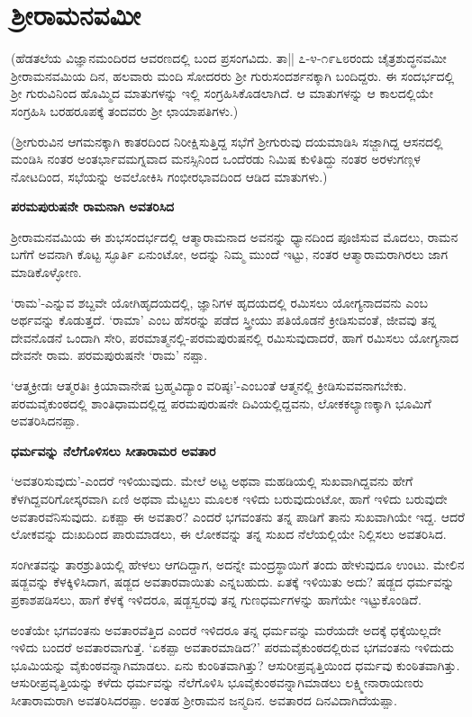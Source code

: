 \chapter{ಶ್ರೀರಾಮನವಮೀ} 

(ಹೆಡತಲೆಯ ವಿಜ್ಞಾನಮಂದಿರದ ಆವರಣದಲ್ಲಿ ಬಂದ ಪ್ರಸಂಗವಿದು. ತಾ|| ೭-೪-೧೯೬೮ರಂದು ಚೈತ್ರಶುದ್ಧನವಮೀ ಶ್ರೀರಾಮನವಮಿಯ ದಿನ, ಹಲವಾರು ಮಂದಿ ಸೋದರರು ಶ್ರೀ ಗುರುಸಂದರ್ಶನಕ್ಕಾಗಿ ಬಂದಿದ್ದರು. ಈ ಸಂದರ್ಭದಲ್ಲಿ ಶ್ರೀ ಗುರುವಿನಿಂದ ಹೊಮ್ಮಿದ ಮಾತುಗಳನ್ನು ಇಲ್ಲಿ ಸಂಗ್ರಹಿಸಿಕೊಡಲಾಗಿದೆ. ಆ ಮಾತುಗಳನ್ನು ಆ ಕಾಲದಲ್ಲಿಯೇ ಸಂಗ್ರಹಿಸಿ ಬರಹರೂಪಕ್ಕೆ ತಂದವರು ಶ್ರೀ ಛಾಯಾಪತಿಗಳು.) 

(ಶ್ರೀಗುರುವಿನ ಆಗಮನಕ್ಕಾಗಿ ಕಾತರದಿಂದ ನಿರೀಕ್ಷಿಸುತ್ತಿದ್ದ ಸಭೆಗೆ ಶ್ರೀಗುರುವು ದಯಮಾಡಿಸಿ ಸಜ್ಜಾಗಿದ್ದ ಆಸನದಲ್ಲಿ ಮಂಡಿಸಿ ನಂತರ ಅಂತರ್ಭಾವಮಗ್ನವಾದ ಮನಸ್ಸಿನಿಂದ ಒಂದೆರಡು ನಿಮಿಷ ಕುಳಿತಿದ್ದು ನಂತರ ಅರಳುಗಣ್ಗಳ ನೋಟದಿಂದ, ಸಭೆಯನ್ನು ಅವಲೋಕಿಸಿ ಗಂಭೀರಭಾವದಿಂದ ಆಡಿದ ಮಾತುಗಳು.) 

\large{\bf{ಪರಮಪುರುಷನೇ ರಾಮನಾಗಿ ಅವತರಿಸಿದ}} 


ಶ್ರೀರಾಮನವಮಿಯ ಈ ಶುಭಸಂದರ್ಭದಲ್ಲಿ ಆತ್ಮಾರಾಮನಾದ ಅವನನ್ನು ಧ್ಯಾನದಿಂದ ಪೂಜಿಸುವ ಮೊದಲು, ರಾಮನ ಬಗೆಗೆ ಅವನಾಗಿ ಕೊಟ್ಟ ಸ್ಫೂರ್ತಿ ಏನುಂಟೋ, ಅದನ್ನು ನಿಮ್ಮ ಮುಂದೆ ಇಟ್ಟು, ನಂತರ ಆತ್ಮಾರಾಮರಾಗಿರಲು ಜಾಗ ಮಾಡಿಕೊಳ್ಳೋಣ. 


`ರಾಮ'-ಎನ್ನುವ ಶಬ್ದವೇ ಯೋಗಿಹೃದಯದಲ್ಲಿ, ಜ್ಞಾನಿಗಳ ಹೃದಯದಲ್ಲಿ ರಮಿಸಲು ಯೋಗ್ಯನಾದವನು ಎಂಬ ಅರ್ಥವನ್ನು ಕೊಡುತ್ತದೆ. `ರಾಮಾ' ಎಂಬ ಹೆಸರನ್ನು ಪಡೆದ ಸ್ತ್ರೀಯು ಪತಿಯೊಡನೆ ಕ್ರೀಡಿಸುವಂತೆ, ಜೀವವು ತನ್ನ ದೇವನೊಡನೆ ಒಂದಾಗಿ ಸೇರಿ, ಪರಮಾತ್ಮನಲ್ಲಿ-ಪರಮಪುರುಷನಲ್ಲಿ ರಮಿಸುವುದಾದರೆ, ಹಾಗೆ ರಮಿಸಲು ಯೋಗ್ಯನಾದ ದೇವನೇ ರಾಮ. ಪರಮಪುರುಷನೇ `ರಾಮ' ನಪ್ಪಾ. 


`ಆತ್ಮಕ್ರೀಡಃ ಆತ್ಮರತಿಃ ಕ್ರಿಯಾವಾನೇಷ ಬ್ರಹ್ಮವಿದ್ಯಾಂ ವರಿಷ್ಠಃ'-ಎಂಬಂತೆ ಆತ್ಮನಲ್ಲಿ ಕ್ರೀಡಿಸುವವನಾಗಬೇಕು. ಪರಮವೈಕುಂಠದಲ್ಲಿ ಶಾಂತಿಧಾಮದಲ್ಲಿದ್ದ ಪರಮಪುರುಷನೇ ದಿವಿಯಲ್ಲಿದ್ದವನು, ಲೋಕಕಲ್ಯಾಣಕ್ಕಾಗಿ ಭೂಮಿಗೆ ಅವತರಿಸಿದನಪ್ಪಾ. 


\large{\bf{ಧರ್ಮವನ್ನು ನೆಲೆಗೊಳಿಸಲು ಸೀತಾರಾಮರ ಅವತಾರ}} 


`ಅವತರಿಸುವುದು'-ಎಂದರೆ ಇಳಿಯುವುದು. ಮೇಲೆ ಅಟ್ಟ ಅಥವಾ ಮಹಡಿಯಲ್ಲಿ ಸುಖವಾಗಿದ್ದವನು ಹೇಗೆ ಕೆಳಗಿದ್ದವರಿಗೋಸ್ಕರವಾಗಿ ಏಣಿ ಅಥವಾ ಮೆಟ್ಟಲು ಮೂಲಕ ಇಳಿದು ಬರುವುದುಂಟೋ, ಹಾಗೆ ಇಳಿದು ಬರುವುದೇ ಅವತಾರವೆನಿಸುವುದು. ಏಕಪ್ಪಾ ಈ ಅವತಾರ? ಎಂದರೆ ಭಗವಂತನು ತನ್ನ ಪಾಡಿಗೆ ತಾನು ಸುಖವಾಗಿಯೇ ಇದ್ದ. ಆದರೆ ಲೋಕವನ್ನು ದುಃಖದಿಂದ ಪಾರುಮಾಡಲು, ಈ ಲೋಕವನ್ನು ತನ್ನ ಸುಖದ ನೆಲೆಯಲ್ಲಿಯೇ ನಿಲ್ಲಿಸಲು ಅವತರಿಸಿದ. 


ಸಂಗೀತವನ್ನು ತಾರಶ್ರುತಿಯಲ್ಲಿ ಹೇಳಲು ಆಗದಿದ್ದಾಗ, ಅದನ್ನೇ ಮಂದ್ರಸ್ಥಾಯಿಗೆ ತಂದು ಹೇಳುವುದೂ ಉಂಟು. ಮೇಲಿನ ಷಡ್ಜವನ್ನು ಕೆಳಕ್ಕಿಳಿಸಿದಾಗ, ಷಡ್ಜದ ಅವತಾರವಾಯಿತು ಎನ್ನಬಹುದು. ಏತಕ್ಕೆ ಇಳಿಯಿತು ಅದು? ಷಡ್ಜದ ಧರ್ಮವನ್ನು ಪ್ರಕಾಶಪಡಿಸಲು, ಹಾಗೆ ಕೆಳಕ್ಕೆ ಇಳಿದರೂ, ಷಡ್ಜಸ್ವರವು ತನ್ನ ಗುಣಧರ್ಮಗಳನ್ನು ಹಾಗೆಯೇ ಇಟ್ಟುಕೊಂಡಿದೆ. 


ಅಂತೆಯೇ ಭಗವಂತನು ಅವತಾರವೆತ್ತಿದ ಎಂದರೆ ಇಳಿದರೂ ತನ್ನ ಧರ್ಮವನ್ನು ಮರೆಯದೇ ಅದಕ್ಕೆ ಧಕ್ಕೆಯಿಲ್ಲದೇ ಇಳಿದು ಬಂದರೆ ಅವತಾರವಾಗುತ್ತೆ. `ಏಕಪ್ಪಾ ಅವತಾರಮಾಡಿದ?' ಪರಮವೈಕುಂಠದಲ್ಲಿರುವ ಭಗವಂತನು ಇಳಿದುದು ಭೂಮಿಯನ್ನು ವೈಕುಂಠವನ್ನಾಗಿಮಾಡಲು. ಏನು ಕುಂಠಿತವಾಗಿತ್ತು? ಆಸುರೀಪ್ರವೃತ್ತಿಯಿಂದ ಧರ್ಮವು ಕುಂಠಿತವಾಗಿತ್ತು. ಆಸುರೀಪ್ರವೃತ್ತಿಯನ್ನು ಕಳೆದು ಧರ್ಮವನ್ನು ನೆಲೆಗೊಳಿಸಿ ಭೂವೈಕುಂಠವನ್ನಾಗಿಮಾಡಲು ಲಕ್ಷ್ಮೀನಾರಾಯಣರು ಸೀತಾರಾಮರಾಗಿ ಅವತರಿಸಿದರಪ್ಪಾ. ಅಂತಹ ಶ್ರೀರಾಮನ ಜನ್ಮದಿನ. ಅವತಾರದ ದಿನವಿದಾಗಿದೆಯಪ್ಪಾ. 


